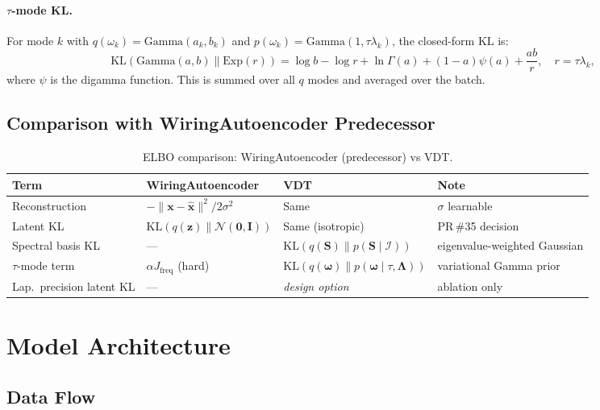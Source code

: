 \documentclass[11pt,a4paper]{article}
\newcommand{\KL}{\mathrm{KL}}
\newcommand{\N}{\mathcal{N}}
\newcommand{\I}{\mathcal{I}}
\newcommand{\bLambda}{\bm{\Lambda}}
\newcommand{\bS}{\bm{S}}
\newcommand{\bz}{\bm{z}}
\newcommand{\bomega}{\bm{\omega}}
\newcommand{\bx}{\bm{x}}
\begin{document}
\paragraph{$\tau$-mode KL.}
For mode $k$ with $q(\omega_k)=\mathrm{Gamma}(a_k, b_k)$ and
$p(\omega_k)=\mathrm{Gamma}(1, \tau\lambda_k)$, the closed-form KL is:
\begin{equation}
  \KL(\mathrm{Gamma}(a,b)\|\mathrm{Exp}(r)) =
  \log b - \log r + \ln\Gamma(a) + (1-a)\psi(a) + \frac{ab}{r},
  \quad r = \tau\lambda_k,
  \label{eq:kl_tau}
\end{equation}
where $\psi$ is the digamma function.  This is summed over all $q$ modes and
averaged over the batch.

\subsection{Comparison with WiringAutoencoder Predecessor}

\begin{table}[h]
\centering
\caption{ELBO comparison: WiringAutoencoder (predecessor) vs VDT.}
\label{tab:elbo_comparison}
\begin{tabular}{@{}llll@{}}
\toprule
Term & WiringAutoencoder & VDT & Note \\
\midrule
Reconstruction & $-\|\bx-\hat{\bx}\|^2/2\sigma^2$ & Same & $\sigma$ learnable \\
Latent KL & $\KL(q(\bz)\|\N(\mathbf{0},\bm{I}))$ & Same (isotropic) & PR\,\#35 decision \\
Spectral basis KL & --- & $\KL(q(\bS)\|p(\bS\mid\I))$ & eigenvalue-weighted Gaussian \\
$\tau$-mode term & $\alpha J_{\mathrm{freq}}$ (hard) & $\KL(q(\bomega)\|p(\bomega\mid\tau,\bLambda))$ & variational Gamma prior \\
Lap.~precision latent KL & --- & \emph{design option} & ablation only \\
\bottomrule
\end{tabular}
\end{table}

\section{Model Architecture}
\label{sec:modules}

\subsection{Data Flow}
\end{document}
